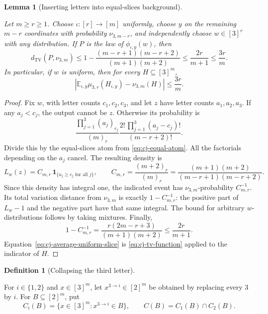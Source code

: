 \documentclass[11pt]{amsart}
\newcommand{\one}{\mathbf 1}
\newtheorem{lemma}[theorem]{Lemma}
\theoremstyle{definition}
\newtheorem{definition}[theorem]{Definition}
\theoremstyle{remark}
\numberwithin{equation}{section}
\providecommand{\lean}[1]{}
\providecommand{\leanok}{}
\begin{document}
\begin{lemma}[Inserting letters into equal-slices background]
\label{cj:transfer-equal}
\lean{Auto.cj_transfer_equal,Auto.cj_transfer_equal_average}
\leanok
Let $m\ge r\ge1$.  Choose $\iota:[r]\to[m]$ uniformly, choose
$y$ on the remaining $m-r$ coordinates with probability
$\nu_{3,m-r}$, and independently choose $w\in[3]^r$ with any
distribution.  If $P$ is the law of $\phi_{\iota,y}(w)$, then
\begin{equation}\label{eq:cj-equal-transfer}
 d_{\mathrm{TV}}(P,\nu_{3,m})
 \le 1-\frac{(m-r+1)(m-r+2)}{(m+1)(m+2)}
 \le\frac{2r}{m+1}\le\frac{3r}{m}.
\end{equation}
In particular, if $w$ is uniform, then for every $H\subseteq[3]^m$,
\begin{equation}\label{eq:cj-average-uniform-slice}
 \left|\mathbb E_{\iota,y}
       \mu_{3,r}(H_{\iota,y})-\nu_{3,m}(H)\right|
 \le\frac{3r}{m}.
\end{equation}
\end{lemma}
\begin{proof}
Fix $w$, with letter counts $c_1,c_2,c_3$, and let $z$ have
letter counts $a_1,a_2,a_3$.  If any $a_j<c_j$, the output cannot
be $z$.  Otherwise its probability is
\[
 \frac{\prod_{j=1}^3(a_j)_{c_j}}{(m)_r}
 \frac{2!\,\prod_{j=1}^3(a_j-c_j)!}{(m-r+2)!}.
\]
Divide this by the equal-slices atom from
\eqref{eq:cj-equal-atom}.  All the factorials depending on the
$a_j$ cancel.  The resulting density is
\[
 L_w(z)=C_{m,r}\,\one_{\{a_j\ge c_j\text{ for all }j\}},
 \qquad
 C_{m,r}=\frac{(m+2)_r}{(m)_r}
 =\frac{(m+1)(m+2)}{(m-r+1)(m-r+2)}.
\]
Since this density has integral one, the indicated event has
$\nu_{3,m}$-probability $C_{m,r}^{-1}$.  Its total variation distance
from $\nu_{3,m}$ is exactly $1-C_{m,r}^{-1}$: the positive part of
$L_w-1$ and the negative part have that same integral.
The bound for arbitrary $w$-distributions follows by taking mixtures.
Finally,
\[
 1-C_{m,r}^{-1}
   =\frac{r(2m-r+3)}{(m+1)(m+2)}
   \le\frac{2r}{m+1}.
\]
Equation~\eqref{eq:cj-average-uniform-slice} is
\eqref{eq:cj-tv-function} applied to the indicator of $H$.
\end{proof}

\begin{definition}[Collapsing the third letter]\label{cj:collapse}
\lean{Auto.collapse,Auto.collapseSet,Auto.collapseBoth,Auto.binaryTrace}
For $i\in\{1,2\}$ and $x\in[3]^m$, let $x^{3\to i}\in[2]^m$
be obtained by replacing every $3$ by $i$.  For $B\subseteq[2]^m$,
put
\[
 C_i(B)=\{x\in[3]^m:x^{3\to i}\in B\},
 \qquad C(B)=C_1(B)\cap C_2(B).
\]
\end{definition}
\end{document}
